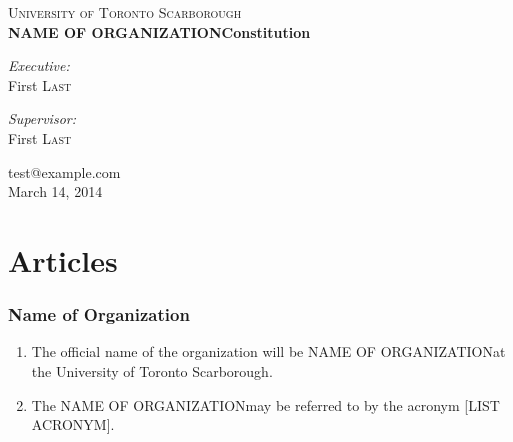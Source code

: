 \documentclass[12pt]{article}
\makeatletter
\newcommand{\orgname}{NAME OF ORGANIZATION\space}
\newcommand{\orgemail}{test@example.com}
\newcommand{\creationdate}{March 14, 2014}
\makeatother
\begin{document}

\begin{titlepage}
\begin{center}

\textsc{\LARGE University of Toronto Scarborough}\\[3.0cm]

{ \huge \bfseries \orgname Constitution\\[1.0cm] }

\begin{minipage}{0.4\textwidth}
\begin{flushleft} \large
\emph{Executive:}\\
First \textsc{Last}
\end{flushleft}
\end{minipage}
\begin{minipage}{0.4\textwidth}
\begin{flushright} \large
\emph{Supervisor:} \\
First \textsc{Last}
\end{flushright}
\end{minipage}

\vfill

{\orgemail}\\
{\creationdate}
\end{center}
\end{titlepage}


\part{Articles}

\section{Name of Organization}
\begin{enumerate}[{1}.1]
    \item The official name of the organization will be \orgname at the University of Toronto Scarborough.
    \item The \orgname may be referred to by the acronym [LIST ACRONYM].
\end{enumerate}


\end{document}
